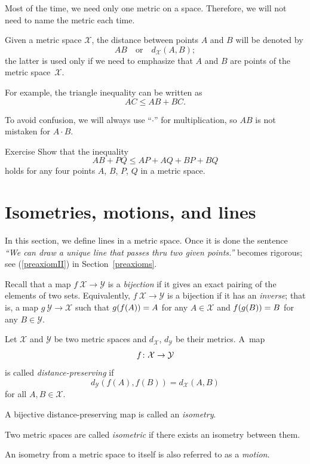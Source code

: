 Most of the time, we need only one metric on a space.
Therefore, we will not need to name the metric each time.

Given a metric space $\mathcal X$,
the distance between points $A$ and $B$ will be denoted by
$$AB
\quad
\text{or}
\quad
d_{\mathcal X}(A,B);$$
the latter is used only if we need to emphasize that $A$ and $B$ are points of the metric space~$\mathcal X$.

For example, the triangle inequality can be written as 
$$AC\le AB+BC.$$

To avoid confusion, we will always use ``$\cdot$'' for multiplication,
so $AB$ is not mistaken for $A\cdot B$.

\begin{thm}{Exercise}\label{ex:4-triangle}
Show that the inequality
\[AB+PQ\le AP+AQ+BP+BQ\]
holds for any four points $A$, $B$, $P$, $Q$ in a metric space.
\end{thm}


\section{Isometries, motions, and lines}

In this section, we define lines in a metric space.
Once it is done the sentence \textit{``We can draw a unique line that passes thru two given points.''} becomes rigorous; see (\ref{preaxiomII}) in Section~\ref{preaxioms}. 

Recall that a map $f\:\mathcal{X}\to\mathcal{Y}$
is a \emph{bijection}
if it gives an exact pairing of the elements of two sets.
Equivalently, $f\:\mathcal{X}\to\mathcal{Y}$ is a bijection if it has an \emph{inverse};
that is, a map $g\:\mathcal{Y}\to\mathcal{X}$
such that 
$g(f(A))\z=A$ for any $A\in\mathcal{X}$
and
$f(g(B))\z=B$ for any $B\in\mathcal{Y}$. 

Let $\mathcal X$ and $\mathcal Y$ be two metric spaces and $d_{\mathcal X}$, $d_{\mathcal Y}$ be their metrics. 
A~map 
$$f\:\mathcal X \z\to \mathcal Y$$ 
is
called \emph{distance-preserving} if 
$$d_{\mathcal Y}(f(A), f(B))
 = d_{\mathcal X}(A,B)$$
for all $A,B\in {\mathcal X}$.

A bijective distance-preserving map is called an \emph{isometry}. 

Two metric spaces are called \emph{isometric} if there exists an isometry between them.

An isometry from a metric space to itself is also referred to as a \emph{motion}.


